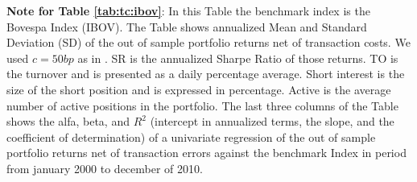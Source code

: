 \documentclass[preprint,authoryear,review,12pt]{elsarticle}
\begin{document}
\begin{singlespace}
{\footnotesize
\textbf{Note for Table \ref{tab:tc:ibov}}:
In this Table the benchmark index is the Bovespa Index (IBOV).
The Table shows annualized Mean and Standard Deviation (SD) of the out of sample portfolio returns net of transaction costs.
We used $c=50bp$ as in \cite{dgu2009}.
SR is the annualized Sharpe Ratio of those returns.
TO is the turnover and is presented as a daily percentage average.
Short interest is the size of the short position and is expressed in percentage.
Active is the average number of active positions in the portfolio.
The last three columns of the Table shows the alfa, beta, and $R^2$ (intercept in annualized terms, the slope, and the coefficient of determination) of a univariate regression of the out of sample portfolio returns net of transaction errors against the benchmark Index in period from january 2000 to december of 2010.}
\end{singlespace}

\clearpage
\end{document}
